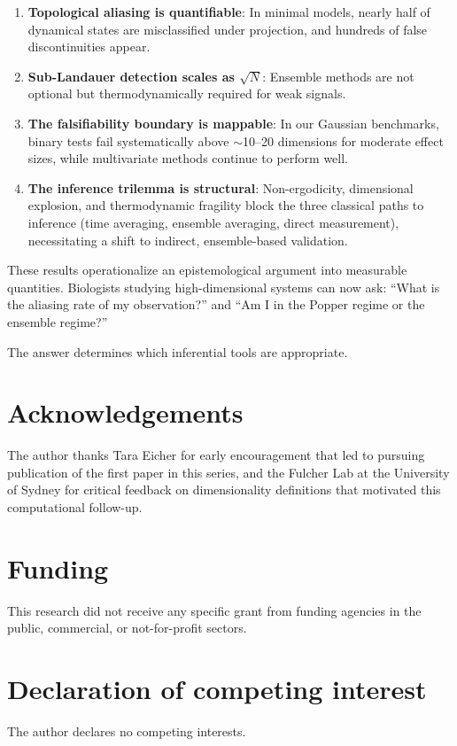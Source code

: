 \documentclass[12pt]{article}
\begin{document}
\begin{enumerate}
    \item \textbf{Topological aliasing is quantifiable}: In minimal models, nearly half of dynamical states are misclassified under projection, and hundreds of false discontinuities appear.

    \item \textbf{Sub-Landauer detection scales as $\sqrt{N}$}: Ensemble methods are not optional but thermodynamically required for weak signals.

    \item \textbf{The falsifiability boundary is mappable}: In our Gaussian benchmarks, binary tests fail systematically above $\sim$10--20 dimensions for moderate effect sizes, while multivariate methods continue to perform well.

    \item \textbf{The inference trilemma is structural}: Non-ergodicity, dimensional explosion, and thermodynamic fragility block the three classical paths to inference (time averaging, ensemble averaging, direct measurement), necessitating a shift to indirect, ensemble-based validation.
\end{enumerate}

These results operationalize an epistemological argument into measurable quantities. Biologists studying high-dimensional systems can now ask: ``What is the aliasing rate of my observation?'' and ``Am I in the Popper regime or the ensemble regime?''

The answer determines which inferential tools are appropriate.

\section*{Acknowledgements}
The author thanks Tara Eicher for early encouragement that led to pursuing publication of the first paper in this series, and the Fulcher Lab at the University of Sydney for critical feedback on dimensionality definitions that motivated this computational follow-up.

\section*{Funding}
This research did not receive any specific grant from funding agencies in the public, commercial, or not-for-profit sectors.

\section*{Declaration of competing interest}
The author declares no competing interests.
\end{document}
